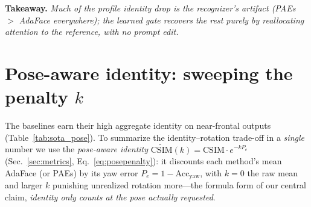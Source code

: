\noindent\textbf{Takeaway.} \emph{Much of the profile identity drop is the
recognizer's artifact (PAEs $>$ AdaFace everywhere); the learned gate recovers
the rest purely by reallocating attention to the reference, with no prompt
edit.}

\begin{table}[t]\centering\small
\setlength{\tabcolsep}{5pt}
\caption[Identity ablation]{\textbf{Identity ablation} ($1400$ generations): mean AdaFace and PAEs CSIM
over detected faces, \emph{raw} and \emph{pose-aware}
$\widetilde{\mathrm{CSIM}}{=}\mathrm{CSIM}\cdot e^{-4P_e}$ at $k{=}4$
(Eq.~\ref{eq:posepenalty}). From the naive FLUX.2 base (identity image\,+\,prompt,
no structural control), \dupid{} and the learned gate recover identity
\emph{purely by reallocating attention to the reference}---no prompt edit. All three
configurations rotate comparably ($73.6$--$82.9\%$ yaw), so the gains persist under
the pose-aware discount.}
\label{tab:id_bins}
\end{table}

\FloatBarrier
\section{Pose-aware identity: sweeping the penalty $k$}
\label{sec:exp_penalized}
The baselines earn their high aggregate identity on near-frontal outputs
(Table~\ref{tab:sota_pose}). To summarize the identity--rotation trade-off in a
\emph{single} number we use the \emph{pose-aware identity}
$\widetilde{\mathrm{CSIM}}(k)=\mathrm{CSIM}\cdot e^{-k P_e}$ (Sec.~\ref{sec:metrics},
Eq.~\ref{eq:posepenalty}): it discounts each method's mean AdaFace (or PAEs)
\csim{} by its yaw error $P_e{=}1-\mathrm{Acc_{yaw}}$, with $k{=}0$ the raw mean and
larger $k$ punishing unrealized rotation more---the formula form of our central
claim, \emph{identity only counts at the pose actually requested}.

